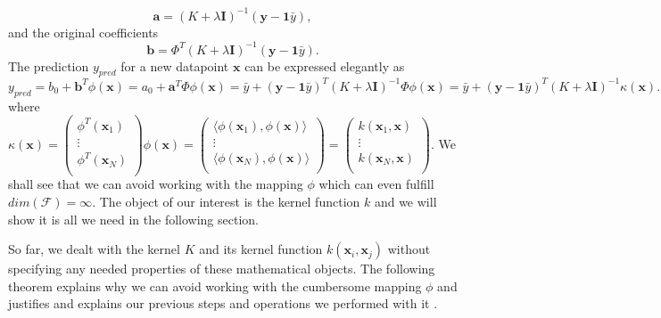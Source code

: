 \documentclass[11pt,oneside,czech,american]{book} %
\theoremstyle{definition} %
\theoremstyle{definition}
\begin{document}
\begin{equation}
	\bm{a} = (K + \lambda \bm{I})^{-1} (\bm{y} - \bm{1}\bar{y}),
\end{equation}
and the original coefficients
\begin{equation}
	\bm{b} = \Phi^T (K + \lambda \bm{I})^{-1} (\bm{y} - \bm{1}\bar{y}).
\end{equation}
The prediction $y_{pred}$ for a new datapoint $\bm{x}$ can be expressed elegantly as
\begin{equation}
	y_{pred} = b_0 + \bm{b}^T \phi(\bm{x}) = a_0 + \bm{a}^T \Phi \phi(\bm{x}) = \bar{y} + (\bm{y} - \bm{1}\bar{y})^T (K + \lambda \bm{I})^{-1} \Phi \phi(\bm{x}) = \bar{y} + (\bm{y} - \bm{1}\bar{y})^T (K + \lambda \bm{I})^{-1} \kappa(\bm{x}).
\end{equation}
where $\kappa(\bm{x}) = \begin{pmatrix}
	\phi^T (\bm{x}_1) \\
	\vdots \\
	\phi^T (\bm{x}_N) \\
\end{pmatrix} \phi(\bm{x}) = \begin{pmatrix}
	\langle \phi (\bm{x}_1), \phi(\bm{x}) \rangle \\
	\vdots \\
	\langle \phi (\bm{x}_N), \phi(\bm{x}) \rangle \\
\end{pmatrix} = \begin{pmatrix}
	k(\bm{x}_1, \bm{x}) \\
	\vdots \\
	k(\bm{x}_N, \bm{x}) \\
\end{pmatrix}$. We shall see that we can avoid working with the mapping $\phi$ which can even fulfill $dim(\mathcal{F}) = \infty$. The object of our interest is the kernel function $k$ and we will show it is all we need in the following section.

So far, we dealt with the kernel $K$ and its kernel function $k(\bm{x}_i, \bm{x}_j)$ without specifying any needed properties of these mathematical objects. The following theorem explains why we can avoid working with the cumbersome mapping $\phi$ and justifies and explains our previous steps and operations we performed with it \parencite{muller01}.
\end{document}
